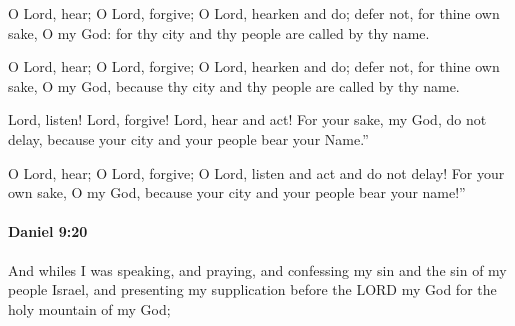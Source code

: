 			O Lord, hear; O Lord, forgive; O Lord, hearken and do; defer not, for thine own sake, O my God: for thy city and thy people are called by thy name.

			\begin{versebox}
					\item[BHS] 
					\item[LXX] 
					\item[ASV] O Lord, hear; O Lord, forgive; O Lord, hearken and do; defer not, for thine own sake, O my God, because thy city and thy people are called by thy name.
					\item[NIV] Lord, listen! Lord, forgive! Lord, hear and act! For your sake, my God, do not delay, because your city and your people bear your Name.”
					\item[NRSV] O Lord, hear; O Lord, forgive; O Lord, listen and act and do not delay! For your own sake, O my God, because your city and your people bear your name!”
			\end{versebox}

		\paragraph{Daniel 9:20} %
			\label{DANIEL-9-20}

			And whiles I was speaking, and praying, and confessing my sin and the sin of my people Israel, and presenting my supplication before the LORD my God for the holy mountain of my God;

